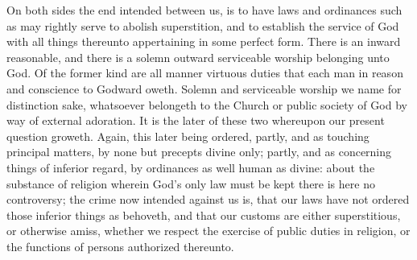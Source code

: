 On both sides the end intended between us, is to have laws and ordinances such as may rightly serve to abolish superstition, and to establish the service of God with all things thereunto appertaining in some perfect form.
There is an inward reasonable, and there is a solemn outward serviceable worship belonging unto God. Of the former kind are all manner virtuous duties that each man in reason and conscience to Godward oweth. Solemn and serviceable worship we name for distinction sake, whatsoever belongeth to the Church or public society of God by way of external adoration. It is the later of these two whereupon our present question groweth.
Again, this later being ordered, partly, and as touching principal matters, by none but precepts divine only; partly, and as concerning things of inferior regard, by ordinances as well human as divine: about the substance of religion wherein God’s only law must be kept there is here no controversy; the crime now intended against us is, that our laws have not ordered those inferior things as behoveth, and that our customs are either superstitious, or otherwise amiss, whether we respect the exercise of public duties in religion, or the functions of persons authorized thereunto.

